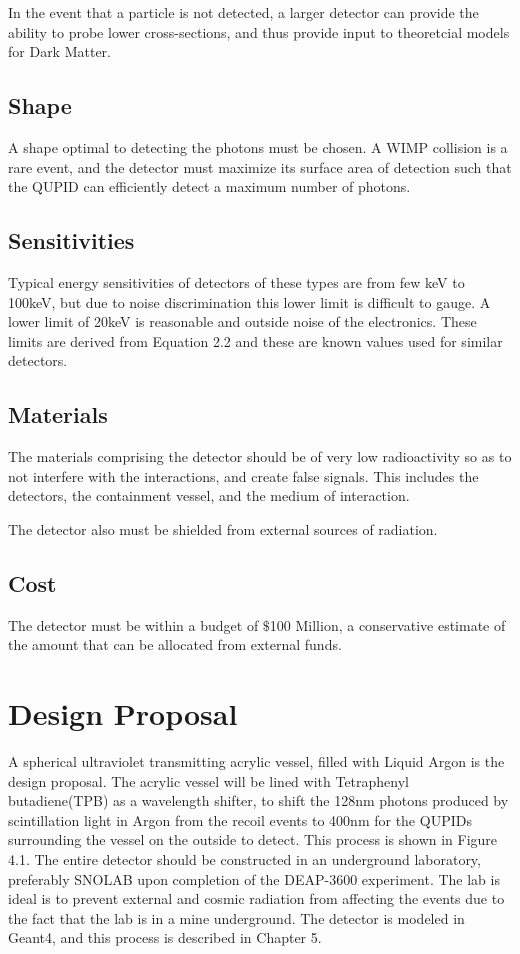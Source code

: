 \documentclass[11pt,a4paper,oneside]{report}
\begin{document}
In the event that a particle is not detected, a larger detector can provide the ability to probe lower cross-sections, and thus provide input to theoretcial models for Dark Matter.

\section{Shape}
A shape optimal to detecting the photons must be chosen. A WIMP collision is a rare event, and the detector must maximize its surface area of detection such that the QUPID can efficiently detect a maximum number of photons. 

\section{Sensitivities}
Typical energy sensitivities of detectors of these types are from few keV to 100keV, but due to noise discrimination this lower limit is difficult to gauge. A lower limit of 20keV is reasonable and outside noise of the electronics. These limits are derived from Equation 2.2 and these are known values used for similar detectors. 

\section{Materials}
The materials comprising the detector should be of very low radioactivity so as to not interfere with the interactions, and create false signals. This includes the detectors, the containment vessel, and the medium of interaction.

The detector also must be shielded from external sources of radiation.

\section{Cost}
The detector must be within a budget of $\$$100 Million, a conservative estimate of the amount that can be allocated from external funds.


\newpage
\chapter{Design Proposal}

A spherical ultraviolet transmitting acrylic vessel, filled with Liquid Argon is the design proposal. The acrylic vessel will be lined with Tetraphenyl butadiene(TPB) as a wavelength shifter, to shift the 128nm photons produced by scintillation light in Argon from the recoil events to 400nm for the QUPIDs surrounding the vessel on the outside to detect. This process is shown in Figure 4.1. The entire detector should be constructed in an underground laboratory, preferably SNOLAB upon completion of the DEAP-3600 experiment. The lab is ideal is to prevent external and cosmic radiation from affecting the events due to the fact that the lab is in a mine underground. The detector is modeled in Geant4, and this process is described in Chapter 5.
\end{document}
